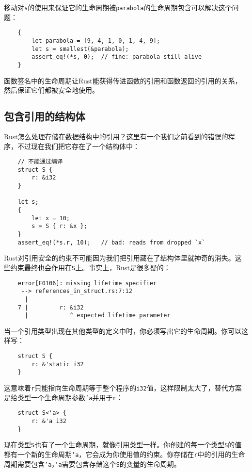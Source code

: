 移动对\texttt{s}的使用来保证它的生命周期被\texttt{parabola}的生命周期包含可以解决这个问题：
\begin{verbatim}
    {
        let parabola = [9, 4, 1, 0, 1, 4, 9];
        let s = smallest(&parabola);
        assert_eq!(*s, 0);  // fine: parabola still alive
    }
\end{verbatim}

函数签名中的生命周期让Rust能获得传进函数的引用和函数返回的引用的关系，然后保证它们都被安全地使用。

\subsection{包含引用的结构体}\label{refstruct}

Rust怎么处理存储在数据结构中的引用？这里有一个我们之前看到的错误的程序，不过现在我们把它存在了一个结构体中：
\begin{verbatim}
    // 不能通过编译
    struct S {
        r: &i32
    }

    let s;
    {
        let x = 10;
        s = S { r: &x };
    }
    assert_eq!(*s.r, 10);   // bad: reads from dropped `x`
\end{verbatim}

Rust对引用安全的约束不可能因为我们把引用藏在了结构体里就神奇的消失。这些约束最终也会作用在\texttt{S}上。事实上，Rust是很多疑的：
\begin{verbatim}
    error[E0106]: missing lifetime specifier
     --> references_in_struct.rs:7:12
      |
    7 |         r: &i32
      |            ^ expected lifetime parameter
\end{verbatim}

当一个引用类型出现在其他类型的定义中时，你必须写出它的生命周期。你可以这样写：
\begin{verbatim}
    struct S {
        r: &'static i32
    }
\end{verbatim}

这意味着\texttt{r}只能指向生命周期等于整个程序的\texttt{i32}值，这样限制太大了，替代方案是给类型一个生命周期参数\texttt{'a}并用于\texttt{r}：
\begin{verbatim}
    struct S<'a> {
        r: &'a i32
    }
\end{verbatim}

现在类型\texttt{S}也有了一个生命周期，就像引用类型一样。你创建的每一个类型\texttt{S}的值都有一个新的生命周期\texttt{'a}，它会成为你使用值的约束。你存储在\texttt{r}中的引用的生命周期需要包含\texttt{'a}，\texttt{'a}需要包含存储这个\texttt{S}的变量的生命周期。

